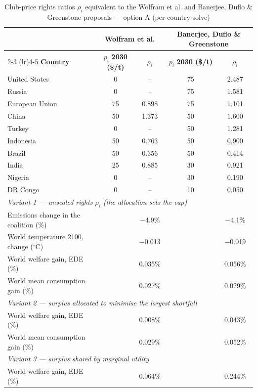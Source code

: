 \begin{table}[htbp]
\centering
\small
\caption{Club-price rights ratios $\rho_i$ equivalent to the Wolfram et al. and Banerjee, Duflo \& Greenstone proposals --- option A (per-country solve)}
\renewcommand{\arraystretch}{1.15}
\begin{tabular}{lcccc}
  \toprule
  & \multicolumn{2}{c}{\textbf{Wolfram et al.}} & \multicolumn{2}{c}{\textbf{Banerjee, Duflo \& Greenstone}} \\
  \cmidrule(lr){2-3} \cmidrule(lr){4-5}
  \textbf{Country} & $p_i$ \textbf{2030 (\$/t)} & $\rho_i$ & $p_i$ \textbf{2030 (\$/t)} & $\rho_i$ \\
  \midrule
  United States & 0 & -- & 75 & 2.487 \\
  Russia & 0 & -- & 75 & 1.581 \\
  European Union & 75 & 0.898 & 75 & 1.101 \\
  China & 50 & 1.373 & 50 & 1.600 \\
  Turkey & 0 & -- & 50 & 1.281 \\
  Indonesia & 50 & 0.763 & 50 & 0.900 \\
  Brazil & 50 & 0.356 & 50 & 0.414 \\
  India & 25 & 0.885 & 30 & 0.921 \\
  Nigeria & 0 & -- & 30 & 0.190 \\
  DR Congo & 0 & -- & 10 & 0.050 \\
  \midrule
  \multicolumn{5}{l}{\textit{Variant 1 --- unscaled rights $\rho_i$ (the allocation sets the cap)}} \\
  \quad Emissions change in the coalition (\%) &  & $-$4.9\% &  & $-$4.1\% \\
  \quad World temperature 2100, change ($^\circ$C) &  & $-$0.013 &  & $-$0.019 \\
  \quad World welfare gain, EDE (\%) &  & 0.035\% &  & 0.056\% \\
  \quad World mean consumption gain (\%) &  & 0.027\% &  & 0.029\% \\
  \midrule
  \multicolumn{5}{l}{\textit{Variant 2 --- surplus allocated to minimise the largest shortfall}} \\
  \quad World welfare gain, EDE (\%) &  & 0.008\% &  & 0.043\% \\
  \quad World mean consumption gain (\%) &  & 0.029\% &  & 0.052\% \\
  \midrule
  \multicolumn{5}{l}{\textit{Variant 3 --- surplus shared by marginal utility}} \\
  \quad World welfare gain, EDE (\%) &  & 0.064\% &  & 0.244\% \\

\end{tabular}
\end{table}
